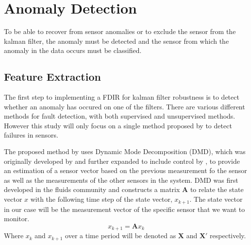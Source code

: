 \documentclass[letterpaper, 10 pt, conference]{ieeeconf}  %
\begin{document}
\section{Anomaly Detection}
To be able to recover from sensor anomalies or to exclude the sensor from the kalman filter, the anomaly must be detected and the sensor from which the anomaly in the data occurs must be classified.

\subsection{Feature Extraction}
The first step to implementing a FDIR for kalman filter robustness is to detect whether an anomaly has occured on one of the filters. There are various different methods for fault detection, with both supervised and unsupervised methods. However this study will only focus on a single method proposed by \textcite{DeSilva2020} to detect failures in sensors.

The proposed method by \textcite{DeSilva2020} uses Dynamic Mode Decomposition (DMD), which was originally developed by \textcite{schmid2011applications} and further expanded to include control by \textcite{proctor2016dynamic}, to provide an estimation of a sensor vector based on the previous measurement fo the sensor as well as the measurements of the other sensors in the system. DMD was first developed in the fluids community and constructs a matrix $\mathbf{A}$ to relate the state vector $x$ with the following time step of the state vector, $x_{k+1}$. The state vector in our case will be the measurement vector of the specific sensor that we want to monitor.
\begin{equation}
	x_{k+1} = \mathbf{A}x_k
\end{equation}
Where $x_k$ and $x_{k+1}$ over a time period will be denoted as $\mathbf{X}$ and $\mathbf{X'}$ respectively.
\end{document}
